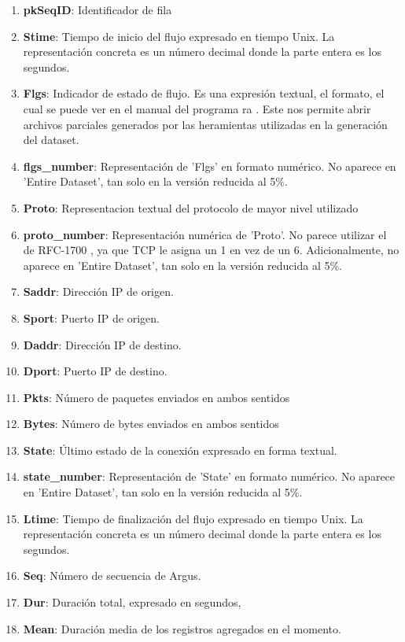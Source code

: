 \begin{enumerate}
    \item \textbf{pkSeqID}: Identificador de fila
    \item \textbf{Stime}: Tiempo de inicio del flujo expresado en tiempo Unix. La representación concreta es un número decimal donde la parte entera es los segundos.
    \item \textbf{Flgs}: Indicador de estado de flujo. Es una expresión textual, el formato, el cual se puede ver en el manual del programa ra \cite{ratool}. Este nos permite abrir archivos parciales generados por las heramientas utilizadas en la generación del dataset.
    \item \textbf{flgs\_number}: Representación de 'Flgs' en formato numérico. No aparece en 'Entire Dataset', tan solo en la versión reducida al 5\%.
    \item \textbf{Proto}: Representacion textual del protocolo de mayor nivel utilizado
    \item \textbf{proto\_number}: Representación numérica de 'Proto'. No parece utilizar el de RFC-1700 \cite{rfc1700}, ya que TCP le asigna un 1 en vez de un 6. Adicionalmente, no aparece en 'Entire Dataset', tan solo en la versión reducida al 5\%.
    \item \textbf{Saddr}: Dirección IP de origen.
    \item \textbf{Sport}: Puerto IP de origen.
    \item \textbf{Daddr}: Dirección IP de destino.
    \item \textbf{Dport}: Puerto IP de destino.
    \item \textbf{Pkts}: Número de paquetes enviados en ambos sentidos
    \item \textbf{Bytes}: Número de bytes enviados en ambos sentidos
    \item \textbf{State}: Último estado de la conexión expresado en forma textual.
    \item \textbf{state\_number}: Representación de 'State' en formato numérico. No aparece en 'Entire Dataset', tan solo en la versión reducida al 5\%.
    \item \textbf{Ltime}: Tiempo de finalización del flujo expresado en tiempo Unix. La representación concreta es un número decimal donde la parte entera es los segundos.
    \item \textbf{Seq}: Número de secuencia de Argus.
    \item \textbf{Dur}: Duración total, expresado en segundos,
    \item \textbf{Mean}: Duración media de los registros agregados en el momento.

\end{enumerate}
